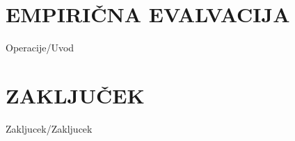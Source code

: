 \documentclass[12pt,a4paper,titlepage,openany,twoside]{report}
\begin{document}
\chapter{EMPIRIČNA EVALVACIJA}\label{sec:OPeracije}
\thispagestyle{fancy} 
{Operacije/Uvod}


\chapter{ZAKLJUČEK}\label{sec:zakljucek}
\thispagestyle{fancy} 
{Zakljucek/Zakljucek}



%
%
%
%
%
%
%
%
%
%
%
%
%
\end{document}
